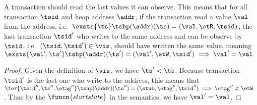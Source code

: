 \begin{lem}[External]
    \label{lem:ext}
    A transaction should read the last values it can observe.
    This means that for all transaction \( \tsid \) and heap address \( \addr \), if the transaction read a value \( \val \) from the address, i.e.\ \( \exsts{ \ts } \tshp(\addr)(\ts) = (\val, \etR, \tsid) \), the last transaction \( \tsid' \) who writes to the same address and can be observe by \( \tsid \), i.e.\ \( (\tsid, \tsid') \in \vis\), should have written the same value, meaning \( \exsts{ \val', \ts' } \tshp(\addr)(\ts') = (\val', \etW, \tsid') \implies \val' = \val\)
\end{lem}
\begin{proof}
    Given the definition of \( \vis \), we have \( \ts' < \ts \).
    Because transaction \( \tsid' \) is the last one who write to the address, this means that \( \for{ \tsid'', \ts'', \etag'' } \tshp(\addr)(\ts'') = (\stub, \etag'', \tsid'') \implies \etag'' \neq \etW \).
    Thus by the \( \funcn{startstate} \) in the semantics, we have \( \val' = \val \).
\end{proof}

